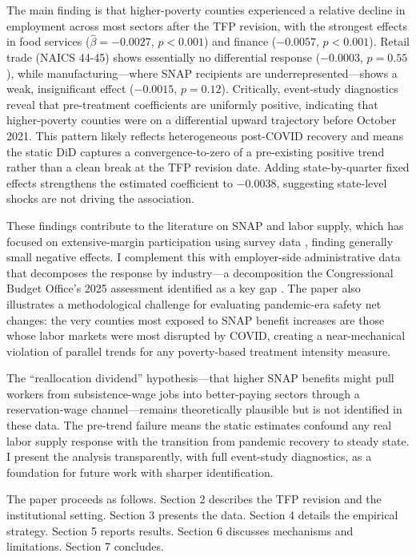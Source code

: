 \documentclass[12pt]{article}
\begin{document}
The main finding is that higher-poverty counties experienced a relative decline in employment across most sectors after the TFP revision, with the strongest effects in food services ($\hat{\beta} = -0.0027$, $p < 0.001$) and finance ($-0.0057$, $p < 0.001$). Retail trade (NAICS 44-45) shows essentially no differential response ($-0.0003$, $p = 0.55$), while manufacturing---where SNAP recipients are underrepresented---shows a weak, insignificant effect ($-0.0015$, $p = 0.12$). Critically, event-study diagnostics reveal that pre-treatment coefficients are uniformly positive, indicating that higher-poverty counties were on a differential upward trajectory before October 2021. This pattern likely reflects heterogeneous post-COVID recovery and means the static DiD captures a convergence-to-zero of a pre-existing positive trend rather than a clean break at the TFP revision date. Adding state-by-quarter fixed effects strengthens the estimated coefficient to $-0.0038$, suggesting state-level shocks are not driving the association.

These findings contribute to the literature on SNAP and labor supply, which has focused on extensive-margin participation using survey data \citep{east2023, hoynes2012, ganong2019}, finding generally small negative effects. I complement this with employer-side administrative data that decomposes the response by industry---a decomposition the Congressional Budget Office's 2025 assessment identified as a key gap \citep{cbo2025}. The paper also illustrates a methodological challenge for evaluating pandemic-era safety net changes: the very counties most exposed to SNAP benefit increases are those whose labor markets were most disrupted by COVID, creating a near-mechanical violation of parallel trends for any poverty-based treatment intensity measure.

The ``reallocation dividend'' hypothesis---that higher SNAP benefits might pull workers from subsistence-wage jobs into better-paying sectors through a reservation-wage channel---remains theoretically plausible but is not identified in these data. The pre-trend failure means the static estimates confound any real labor supply response with the transition from pandemic recovery to steady state. I present the analysis transparently, with full event-study diagnostics, as a foundation for future work with sharper identification.

The paper proceeds as follows. Section 2 describes the TFP revision and the institutional setting. Section 3 presents the data. Section 4 details the empirical strategy. Section 5 reports results. Section 6 discusses mechanisms and limitations. Section 7 concludes.
\end{document}
